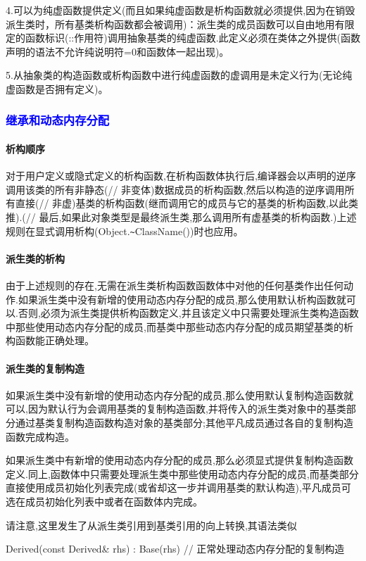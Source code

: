 \documentclass[UTF8]{ctexart}
\begin{document}
4.可以为纯虚函数提供定义(而且如果纯虚函数是析构函数就必须提供,因为在销毁派生类时，所有基类析构函数都会被调用)：派生类的成员函数可以自由地用有限定的函数标识(::作用符)调用抽象基类的纯虚函数.此定义必须在类体之外提供(函数声明的语法不允许纯说明符=0和函数体一起出现)。

5.从抽象类的构造函数或析构函数中进行纯虚函数的虚调用是未定义行为(无论纯虚函数是否拥有定义)。

\subsubsection{\textcolor{blue}{继承和动态内存分配}}
\paragraph{析构顺序}
对于用户定义或隐式定义的析构函数,在析构函数体执行后,编译器会以声明的逆序调用该类的所有非静态(// 非变体)数据成员的析构函数,然后以构造的逆序调用所有直接(// 非虚)基类的析构函数(继而调用它的成员与它的基类的析构函数,以此类推).(// 最后,如果此对象类型是最终派生类,那么调用所有虚基类的析构函数.)上述规则在显式调用析构(Object.\verb|~|ClassName())时也应用。
\paragraph{派生类的析构}
由于上述规则的存在,无需在派生类析构函数函数体中对他的任何基类作出任何动作.如果派生类中没有新增的使用动态内存分配的成员,那么使用默认析构函数就可以.否则,必须为派生类提供析构函数定义,并且该定义中只需要处理派生类构造函数中那些使用动态内存分配的成员,而基类中那些动态内存分配的成员期望基类的析构函数能正确处理。
\paragraph{派生类的复制构造}
如果派生类中没有新增的使用动态内存分配的成员,那么使用默认复制构造函数就可以,因为默认行为会调用基类的复制构造函数,并将传入的派生类对象中的基类部分通过基类复制构造函数构造对象的基类部分;其他平凡成员通过各自的复制构造函数完成构造。

如果派生类中有新增的使用动态内存分配的成员,那么必须显式提供复制构造函数定义.同上,函数体中只需要处理派生类中那些使用动态内存分配的成员,而基类部分直接使用成员初始化列表完成(或省却这一步并调用基类的默认构造),平凡成员可选在成员初始化列表中或者在函数体内完成。

请注意,这里发生了从派生类引用到基类引用的向上转换,其语法类似

Derived(const Derived\& rhs) : Base(rhs){    // 正常处理动态内存分配的复制构造}
\end{document}
